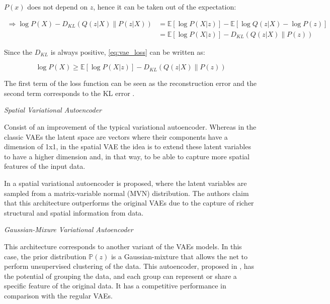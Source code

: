 \begin{math}P(x)\end{math} does not depend on \begin{math}z\end{math}, hence it can be taken out of the expectation:

\begin{equation}
 \begin{aligned} \Longrightarrow \log P(X)-D_{KL}(Q(z | X) \| P(z | X)) &=\mathbb{E}[\log P(X | z)]-\mathbb{E}[\log Q(z | X)-\log P(z)] \\ &=\mathbb{E}[\log P(X | z)]-D_{KL}(Q(z | X) \| P(z)) \end{aligned}
 \label{eq:vae_loss}
\end{equation}

Since the \begin{math}D_{KL}\end{math} is always positive, \ref{eq:vae_loss} can be written as:

\begin{equation}
 \log P(X) \geq \mathbb{E}[\log P(X | z)]-D_{KL}(Q(z | X) \| P(z))
 \label{eq:ineq}
\end{equation}

The first term of the loss function can be seen as the reconstruction error and the second term corresponds to the KL error \cite{Doersch2016}.

\textit{Spatial Variational Autoencoder}

Consist of an improvement of the typical variational autoencoder. Whereas in the classic VAEs the latent space are vectors where their components have a dimension of 1x1, in the spatial VAE the idea is to extend these latent variables to have a higher dimension and, in that way, to be able to capture more spatial features of the input data.

In \cite{Wang2019} a spatial variational autoencoder is proposed, where the latent variables are sampled from a matrix-variable normal (MVN) distribution. The authors claim that this architecture outperforms the original VAEs due to the capture of richer structural and spatial information from data.

\textit{Gaussian-Mixure Variational Autoencoder}

This architecture corresponds to another variant of the VAEs models. In this case, the prior distribution \begin{math}\mathbb{P}(z)\end{math} is a Gaussian-mixture that allows the net to perform unsupervised clustering of the data. This autoencoder, proposed in \cite{Dilokthanakul2016}, has the potential of grouping the data, and each group can represent or share a specific feature of the original data. It has a competitive performance in comparison with the regular VAEs.

